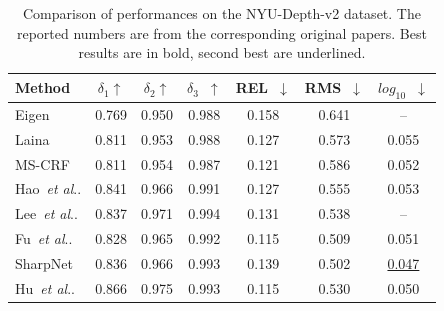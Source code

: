\documentclass{vip-theme}
\makeatletter
\DeclareRobustCommand\onedot{\futurelet\@let@token\@onedot}
\def\@onedot{\ifx\@let@token.\else.\null\fi\xspace}
\def\etal{\emph{et al}\onedot}
\makeatother
\begin{document}
\begin{table}[!htbp]
\centering
\caption{Comparison of performances on the NYU-Depth-v2 dataset. The reported numbers are from the corresponding original papers. Best results are in bold, second best are underlined.}
\begin{tabularx}{\linewidth}{@{}l*{5}{C}c@{}}
\toprule
Method        & \textbf{$\delta_1$}$\uparrow$       & \textbf{$\delta_2$}$\uparrow$          & \textbf{$\delta_3$}~$\uparrow$            & REL~$\downarrow$          & RMS~$\downarrow$  & $log_{10}$~$\downarrow$ \\ \midrule
Eigen                                                       & 0.769          & 0.950          & 0.988          & 0.158            & 0.641          & --              \\ 
Laina                                                   & 0.811          & 0.953          & 0.988          & 0.127            & 0.573          & 0.055                \\ 
 MS-CRF                                                             & 0.811          & 0.954          & 0.987          & 0.121            & 0.586          & 0.052          \\ 
Hao~\etal                                                     & 0.841          & 0.966          & 0.991          & 0.127            & 0.555          & 0.053                \\ 
Lee~\etal                                                    & 0.837          & 0.971          & 0.994          & 0.131            & 0.538          &   --                   \\
Fu~\etal                                                     & 0.828          & 0.965          & 0.992          & 0.115            & 0.509          &   0.051                   \\
SharpNet                                                            & 0.836          & 0.966          & 0.993          & 0.139            & 0.502          &      \underline{0.047}          \\
Hu~\etal                                                               & 0.866          & 0.975          & 0.993          & 0.115            & 0.530          &    0.050            \\ 

\end{tabularx}
\end{table}
\end{document}
